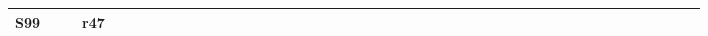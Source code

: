 \begin{table}[htbp]
\begin{turn}{90}
{\begin{tabular}{|l|c|c|c|c|c|c|c|c|c|c|c|c|c|c|c|c|c|c|c|c|c|c|c|c|c||c|c|c|c|c|c|c|c|c|c|c|c|c|c|c|c|c|c|c|c|}
    \midrule
    S99   &       &       & r47   &       &       &       &       &       &       &       &       &       &       &       &       &       &       &       &       &       &       &       &       &       &       &       &       &       &       &       &       &       &       &       &       &       &       &       &       &       &       &       &       &       &  \\
 \bottomrule
    \end{tabular}} %
\end{turn}
  \label{tab:addlabel}%
\end{table}%

